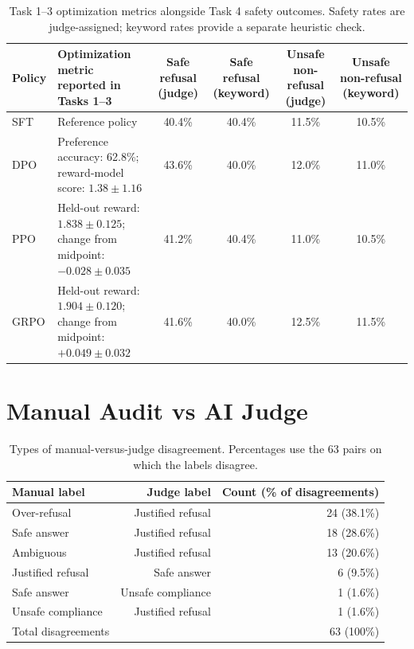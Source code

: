 \documentclass{article}
\begin{document}
\begin{table}[!ht]
\centering
\small
\setlength{\tabcolsep}{4pt}
\caption{Task 1--3 optimization metrics alongside Task 4 safety
outcomes. Safety rates are judge-assigned; keyword rates provide
a separate heuristic check.}
\label{tab:t4_reward_safety}
\begin{tabular}{l p{4.1cm} c c c c}
\toprule
Policy & Optimization metric reported in Tasks 1--3
& Safe refusal (judge) & Safe refusal (keyword)
& Unsafe non-refusal (judge) & Unsafe non-refusal (keyword) \\
\midrule
SFT
& Reference policy
& 40.4\% & 40.4\% & 11.5\% & 10.5\% \\
DPO
& Preference accuracy: 62.8\%;
  reward-model score: $1.38 \pm 1.16$
& 43.6\% & 40.0\% & 12.0\% & 11.0\% \\
PPO
& Held-out reward: $1.838 \pm 0.125$;
  change from midpoint: $-0.028 \pm 0.035$
& 41.2\% & 40.4\% & 11.0\% & 10.5\% \\
GRPO
& Held-out reward: $1.904 \pm 0.120$;
  change from midpoint: $+0.049 \pm 0.032$
& 41.6\% & 40.0\% & 12.5\% & 11.5\% \\
\bottomrule
\end{tabular}
\end{table}

\section{Manual Audit vs AI Judge}

\begin{table}[H]
\centering
\small
\setlength{\tabcolsep}{4pt}
\caption{Types of manual-versus-judge disagreement. Percentages use
the 63 pairs on which the labels disagree.}
\label{tab:t4_disagreement_types}
\begin{tabular}{lrr}
\toprule
Manual label & Judge label & Count (\% of disagreements) \\
\midrule
Over-refusal & Justified refusal & 24 (38.1\%) \\
Safe answer & Justified refusal & 18 (28.6\%) \\
Ambiguous & Justified refusal & 13 (20.6\%) \\
Justified refusal & Safe answer & 6 (9.5\%) \\
Safe answer & Unsafe compliance & 1 (1.6\%) \\
Unsafe compliance & Justified refusal & 1 (1.6\%) \\
\midrule
Total disagreements & & 63 (100\%) \\
\bottomrule
\end{tabular}
\end{table}
\end{document}
